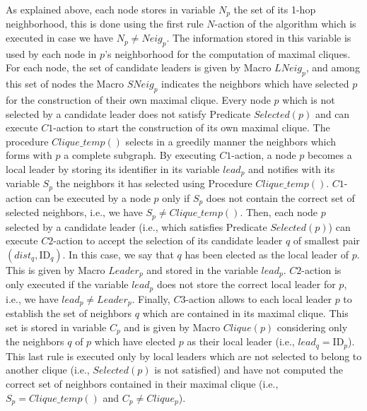 \documentclass[11pt,letterpaper,onecolumn]{article}
\newcommand{\id}{\mbox{ID}}
\begin{document}
As explained above, each node stores in variable $N_p$ the set of its 1-hop neighborhood, this is done using the first rule $N$-action of the algorithm which is executed in case we have $N_p \neq Neig_p$. The information stored in this variable is used by each node in $p$'s neighborhood for the computation of maximal cliques. For each node, the set of candidate leaders is given by Macro $LNeig_p$, and among this set of nodes the Macro $SNeig_p$ indicates the neighbors which have selected $p$ for the construction of their own maximal clique. Every node $p$ which is not selected by a candidate leader does not satisfy Predicate $Selected(p)$ and can execute $C1$-action to start the construction of its own maximal clique. The procedure $Clique\_temp()$ selects in a greedily manner the neighbors which forms with $p$ a complete subgraph. By executing $C1$-action, a node $p$ becomes a local leader by storing its identifier in its variable $lead_p$ and notifies with its variable $S_p$ the neighbors it has selected using Procedure $Clique\_temp()$. $C1$-action can be executed by a node $p$ only if $S_p$ does not contain the correct set of selected neighbors, i.e., we have $S_p \neq Clique\_temp()$. Then, each node $p$ selected by a candidate leader (i.e., which satisfies Predicate $Selected(p)$) can execute $C2$-action to accept the selection of its candidate leader $q$ of smallest pair $(dist_q, \id_q)$. In this case, we say that $q$ has been elected as the local leader of $p$. This is given by Macro $Leader_p$ and stored in the variable $lead_p$. $C2$-action is only executed if the variable $lead_p$ does not store the correct local leader for $p$, i.e., we have $lead_p \neq Leader_p$. Finally, $C3$-action allows to each local leader $p$ to establish the set of neighbors $q$ which are contained in its maximal clique. This set is stored in variable $C_p$ and is given by Macro $Clique(p)$ considering only the neighbors $q$ of $p$ which have elected $p$ as their local leader (i.e., $lead_q=\id_p$). This last rule is executed only by local leaders 
which are not selected to belong to another clique (i.e., $Selected(p)$ is not satisfied) and have not computed the correct set of neighbors contained in their maximal clique (i.e., $S_p=Clique\_temp()$ and $C_p \neq Clique_p$).
\end{document}

